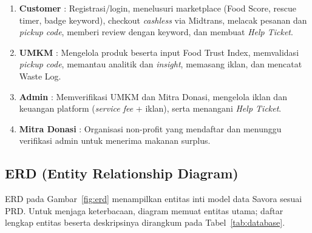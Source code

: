 \begin{enumerate}[leftmargin=*]
    \item \textbf{Customer} : Registrasi/login, menelusuri marketplace (Food Score, rescue timer, badge keyword), checkout \textit{cashless} via Midtrans, melacak pesanan dan \textit{pickup code}, memberi review dengan keyword, dan membuat \textit{Help Ticket}.
    \item \textbf{UMKM} : Mengelola produk beserta input Food Trust Index, memvalidasi \textit{pickup code}, memantau analitik dan \textit{insight}, memasang iklan, dan mencatat Waste Log.
    \item \textbf{Admin} : Memverifikasi UMKM dan Mitra Donasi, mengelola iklan dan keuangan platform (\textit{service fee} + iklan), serta menangani \textit{Help Ticket}.
    \item \textbf{Mitra Donasi} : Organisasi non-profit yang mendaftar dan menunggu verifikasi admin untuk menerima makanan surplus.
\end{enumerate}

\subsection{ERD (Entity Relationship Diagram)}

ERD pada Gambar~\ref{fig:erd} menampilkan entitas inti model data Savora sesuai PRD. Untuk menjaga
keterbacaan, diagram memuat entitas utama; daftar lengkap entitas beserta deskripsinya dirangkum
pada Tabel~\ref{tab:database}.

